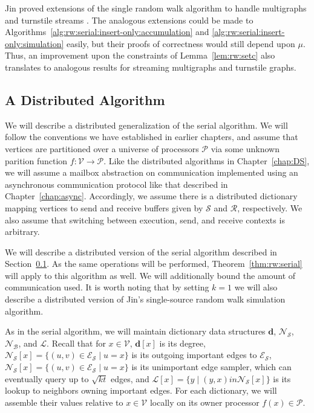 \documentclass[10]{report}
\begin{document}
Jin proved extensions of the single random walk algorithm to handle multigraphs and turnstile streams \cite{jin2018simulating}.
The analogous extensions could be made to Algorithms~\ref{alg:rw:serial:insert-only:accumulation} and \ref{alg:rw:serial:insert-only:simulation} easily, but their proofs of correctness would still depend upon $\mu$.
Thus, an improvement upon the constraints of Lemma~\ref{lem:rw:setc} also translates to analogous results for streaming multigraphs and turnstile graphs. 


\subsection{A Distributed Algorithm}
 \label{walks:sec:walks:distributed}

We will describe a distributed generalization of the serial algorithm.
We will follow the conventions we have established in earlier chapters, and assume that vertices are partitioned over a universe of processors $\mathcal{P}$ via some unknown parition function $f : \mathcal{V} \rightarrow \mathcal{P}$.
Like the distributed algorithms in Chapter~\ref{chap:DS}, we will assume a mailbox abstraction on communication implemented using an asynchronous communication protocol like that described in Chapter~\ref{chap:async}.
Accordingly, we assume there is a distributed dictionary mapping vertices to send and receive buffers given by $\mathcal{S}$ and $\mathcal{R}$, respectively.
We also assume that switching between execution, send, and receive contexts is arbitrary.

We will describe a distributed version of the serial algorithm described in Section~\ref{walks:sec:walks:distributed}.
As the same operations will be performed, Theorem~\ref{thm:rw:serial} will apply to this algorithm as well.
We will additionally bound the amount of communication used.
It is worth noting that by setting $k =1$ we will also describe a distributed version of Jin's single-source random walk simulation algorithm.

As in the serial algorithm, we will maintain dictionary data structures $\mathbf{d}$, $\mathcal{N}_\mathcal{S}$, $\mathcal{N}_\mathcal{B}$, and $\mathcal{L}$.
Recall that for $x \in \mathcal{V}$, $\mathbf{d}[x]$ is its degree, $\mathcal{N}_\mathcal{S}[x] = \{(u, v) \in \mathcal{E}_\mathcal{S} \mid u = x \}$ is its outgoing important edges to $\mathcal{E}_\mathcal{S}$, $\mathcal{N}_\mathcal{S}[x] = \{(u, v) \in \mathcal{E}_\mathcal{S} \mid u = x \}$ is its unimportant edge sampler, which can eventually query up to $\sqrt{kt}$ edges, and $\mathcal{L}[x] = \{ y \mid (y, x) in \mathcal{N}_\mathcal{S}[x] \}$ is its lookup to neighbors owning important edges.
For each dictionary, we will assemble their values relative to $x \in \mathcal{V}$ locally on its owner processor $f(x) \in \mathcal{P}$.
\end{document}
